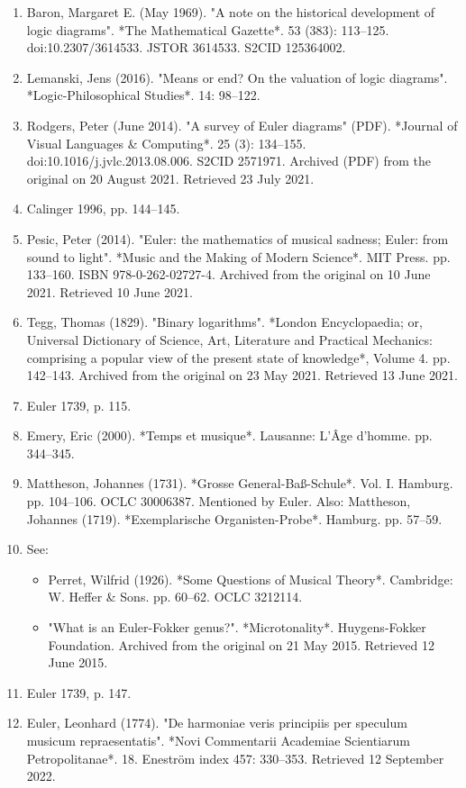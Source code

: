 \begin{enumerate}
\item Baron, Margaret E. (May 1969). "A note on the historical development of logic diagrams". *The Mathematical Gazette*. 53 (383): 113–125. doi:10.2307/3614533. JSTOR 3614533. S2CID 125364002.
\item Lemanski, Jens (2016). "Means or end? On the valuation of logic diagrams". *Logic-Philosophical Studies*. 14: 98–122.
\item Rodgers, Peter (June 2014). "A survey of Euler diagrams" (PDF). *Journal of Visual Languages & Computing*. 25 (3): 134–155. doi:10.1016/j.jvlc.2013.08.006. S2CID 2571971. Archived (PDF) from the original on 20 August 2021. Retrieved 23 July 2021.
\item Calinger 1996, pp. 144–145.
\item Pesic, Peter (2014). "Euler: the mathematics of musical sadness; Euler: from sound to light". *Music and the Making of Modern Science*. MIT Press. pp. 133–160. ISBN 978-0-262-02727-4. Archived from the original on 10 June 2021. Retrieved 10 June 2021.
\item Tegg, Thomas (1829). "Binary logarithms". *London Encyclopaedia; or, Universal Dictionary of Science, Art, Literature and Practical Mechanics: comprising a popular view of the present state of knowledge*, Volume 4. pp. 142–143. Archived from the original on 23 May 2021. Retrieved 13 June 2021.
\item Euler 1739, p. 115.
\item Emery, Eric (2000). *Temps et musique*. Lausanne: L'Âge d'homme. pp. 344–345.
\item Mattheson, Johannes (1731). *Grosse General-Baß-Schule*. Vol. I. Hamburg. pp. 104–106. OCLC 30006387. Mentioned by Euler. Also: Mattheson, Johannes (1719). *Exemplarische Organisten-Probe*. Hamburg. pp. 57–59.
\item See:  
\begin{itemize}
\item Perret, Wilfrid (1926). *Some Questions of Musical Theory*. Cambridge: W. Heffer & Sons. pp. 60–62. OCLC 3212114.  
\item "What is an Euler-Fokker genus?". *Microtonality*. Huygens-Fokker Foundation. Archived from the original on 21 May 2015. Retrieved 12 June 2015.
\end{itemize}
\item Euler 1739, p. 147.
\item Euler, Leonhard (1774). "De harmoniae veris principiis per speculum musicum repraesentatis". *Novi Commentarii Academiae Scientiarum Petropolitanae*. 18. Eneström index 457: 330–353. Retrieved 12 September 2022.

\end{enumerate}
